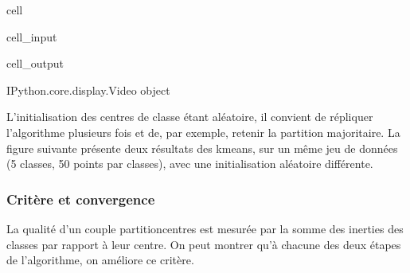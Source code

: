 \documentclass[letterpaper,10pt,french]{sphinxmanual}
\begin{document}
\sphinxAtStartPar
{}

\begin{sphinxuseclass}{cell}
\begin{sphinxuseclass}{cell_input}
\begin{sphinxVerbatim}[commandchars=\\\{\}]
   
 
\end{sphinxVerbatim}

\end{sphinxuseclass}
\begin{sphinxuseclass}{cell_output}
\begin{sphinxVerbatim}[commandchars=\\\{\}]
\PYGZlt{}IPython.core.display.Video object\PYGZgt{}
\end{sphinxVerbatim}

\end{sphinxuseclass}
\end{sphinxuseclass}
\sphinxAtStartPar
L’initialisation des centres de classe étant aléatoire, il convient de répliquer l’algorithme plusieurs fois et de, par exemple, retenir la partition majoritaire. La figure suivante présente deux résultats des k\sphinxhyphen{}means, sur un même jeu de données (5 classes, 50 points par classes), avec une initialisation aléatoire différente.

\sphinxAtStartPar
{}


\subsubsection{Critère et convergence}
\label{\detokenize{clustering:critere-et-convergence}}
\sphinxAtStartPar
La qualité d’un couple partition\sphinxhyphen{}centres est mesurée par la somme des inerties des classes par rapport à leur centre. On peut montrer qu’à chacune des deux étapes de l’algorithme, on améliore ce critère.
\end{document}
